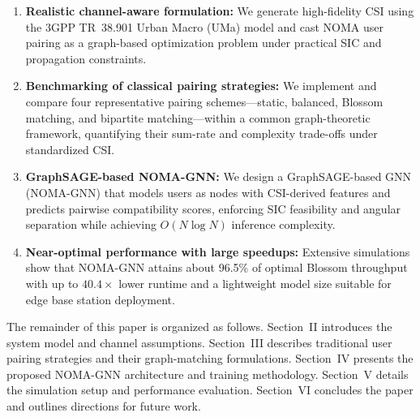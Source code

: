 \documentclass[conference]{IEEEtran}
\begin{document}
\begin{enumerate}
    \item \textbf{Realistic channel-aware formulation:} We generate high-fidelity CSI using the 3GPP TR~38.901 Urban Macro (UMa) model and cast NOMA user pairing as a graph-based optimization problem under practical SIC and propagation constraints.

    \item \textbf{Benchmarking of classical pairing strategies:} We implement and compare four representative pairing schemes—static, balanced, Blossom matching, and bipartite matching—within a common graph-theoretic framework, quantifying their sum-rate and complexity trade-offs under standardized CSI.

    \item \textbf{GraphSAGE-based NOMA-GNN:} We design a GraphSAGE-based GNN (NOMA-GNN) that models users as nodes with CSI-derived features and predicts pairwise compatibility scores, enforcing SIC feasibility and angular separation while achieving $O(N \log N)$ inference complexity.

    \item \textbf{Near-optimal performance with large speedups:} Extensive simulations show that NOMA-GNN attains about 96.5\% of optimal Blossom throughput with up to $40.4\times$ lower runtime and a lightweight model size suitable for edge base station deployment.
\end{enumerate}


The remainder of this paper is organized as follows. Section~II introduces the system model and channel assumptions. Section~III describes traditional user pairing strategies and their graph-matching formulations. Section~IV presents the proposed NOMA-GNN architecture and training methodology. Section~V details the simulation setup and performance evaluation. Section~VI concludes the paper and outlines directions for future work.
\end{document}
